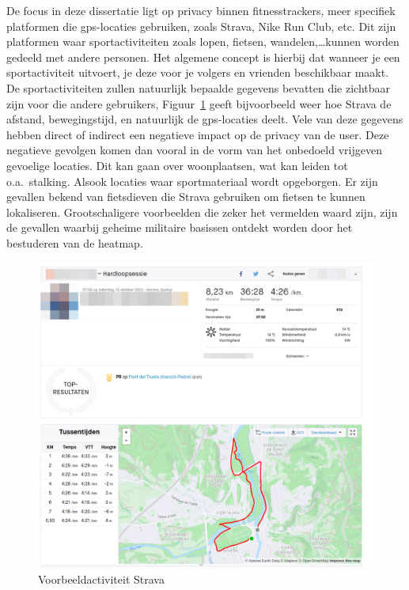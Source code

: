 De focus in deze dissertatie ligt op privacy binnen fitnesstrackers, meer
specifiek platformen die gps-locaties gebruiken, zoals Strava, Nike Run Club,
etc. Dit zijn platformen waar sportactiviteiten zoals lopen, fietsen,
wandelen,\ldots kunnen worden gedeeld met andere personen. Het algemene concept
is hierbij dat wanneer je een sportactiviteit uitvoert, je deze voor je volgers
en vrienden beschikbaar maakt. De sportactiviteiten zullen natuurlijk bepaalde
gegevens bevatten die zichtbaar zijn voor die andere gebruikers,
Figuur~\ref{fig:activityExample} geeft bijvoorbeeld weer hoe Strava de
afstand, bewegingstijd, en natuurlijk de gps-locaties deelt. Vele van deze
gegevens hebben direct of indirect een negatieve impact op de privacy van de
user. Deze negatieve gevolgen komen dan vooral in de vorm van het onbedoeld
vrijgeven gevoelige locaties. Dit kan gaan over woonplaatsen, wat kan leiden
tot o.a.\ stalking. Alsook locaties waar sportmateriaal wordt opgeborgen. Er
zijn gevallen bekend van fietsdieven die Strava gebruiken om fietsen te kunnen
lokaliseren\cite{Sportapp72:online}\cite{Cyclistw89:online}. Grootschaligere
voorbeelden die zeker het vermelden waard zijn, zijn de gevallen waarbij geheime
militaire basissen ontdekt worden door het bestuderen van de heatmap\cite{Fitnesst33:online}.
\begin{figure}
    \centering
    \includegraphics[width=0.5\linewidth]{fig/VoorbeeldActiviteit_Cropped.png}
    \caption{Voorbeeldactiviteit Strava}\label{fig:activityExample}
\end{figure}

